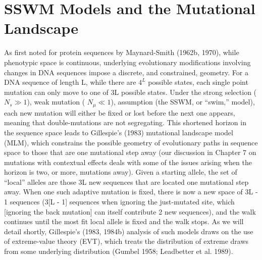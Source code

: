 \documentclass{article}
\begin{document}
\section{SSWM Models and the Mutational Landscape}
As first noted for protein sequences by Maynard-Smith (1962b, 1970), while phenotypic space is continuous, underlying evolutionary modifications involving changes in DNA sequences impose a discrete, and constrained, geometry. For a DNA sequence of length L, while there are  $ 4^L $ possible states, each single point mutation can only move to one of 3L possible states. Under the strong selection ( $ N_s \gg 1 $), weak mutation ( $ N_\mu \ll 1 $), assumption (the SSWM, or “swim,” model), each new mutation will either be fixed or lost before the next one appears, meaning that double-mutations are not segregating. This shortened horizon in the sequence space leads to Gillespie’s (1983) mutational landscape model (MLM), which constrains the possible geometry of evolutionary paths in sequence space to those that are one mutational step away (our discussion in Chapter 7 on mutations with contextual effects deals with some of the issues arising when the horizon is two, or more, mutations away). Given a starting allele, the set of “local” alleles are those 3L new sequences that are located one mutational step away. When one such adaptive mutation is fixed, there is now a new space of 3L - 1 sequences (3[L - 1] sequences when ignoring the just-mutated site, which [ignoring the back mutation] can itself contribute 2 new sequences), and the walk continues until the most fit local allele is fixed and the walk stops. As we will detail shortly, Gillespie’s (1983, 1984b) analysis of such models draws on the use of extreme-value theory (EVT), which treats the distribution of extreme draws from some underlying distribution (Gumbel 1958; Leadbetter et al. 1989).
\end{document}
